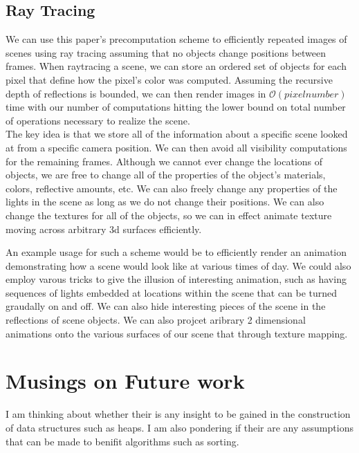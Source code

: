 \documentclass[11pt]{article} %
\newcommand{\bigO}{\mathcal{O}}
\begin{document}
\subsection{Ray Tracing}

We can use this paper's precomputation scheme to efficiently repeated images of scenes using ray tracing assuming that no objects change positions between frames. When raytracing a scene, we can store an ordered set of objects for each pixel that define how the pixel's color was computed. Assuming the recursive depth of reflections is bounded, we can then render images in $\bigO(pixel number)$ time with our number of computations hitting the lower bound on total number of operations necessary to realize the scene.\\

The key idea is that we store all of the information about a specific scene looked at from a specific camera position. We can then avoid all visibility computations for the remaining frames. Although we cannot ever change the locations of objects, we are free to change all of the properties of the object's materials, colors, reflective amounts, etc. We can also freely change any properties of the lights in the scene as long as we do not change their positions. We can also change the textures for all of the objects, so we can in effect animate texture moving across arbitrary 3d surfaces efficiently.

An example usage for such a scheme would be to efficiently render an animation demonstrating how a scene would look like at various times of day. We could also employ varous tricks to give the illusion of interesting animation, such as having sequences of lights embedded at locations within the scene that can be turned graudally on and off. We can also hide interesting pieces of the scene in the reflections of scene objects. We can also projcet aribrary 2 dimensional animations onto the various surfaces of our scene that through texture mapping.

\section{Musings on Future work}

I am thinking about whether their is any insight to be gained in the construction of data structures such as heaps. I am also pondering if their are any assumptions that can be made to benifit algorithms such as sorting.
\end{document}
